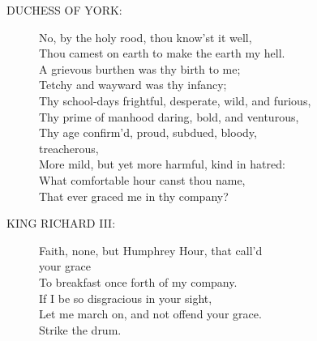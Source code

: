 \documentclass{article}
\begin{document}
\begin{description}
\item[DUCHESS OF YORK:] 
\hspace{1pt}No, by the holy rood, thou know'st it well,\\
\hspace{1pt}Thou camest on earth to make the earth my hell.\\
\hspace{1pt}A grievous burthen was thy birth to me;\\
\hspace{1pt}Tetchy and wayward was thy infancy;\\
\hspace{1pt}Thy school-days frightful, desperate, wild, and furious,\\
\hspace{1pt}Thy prime of manhood daring, bold, and venturous,\\
\hspace{1pt}Thy age confirm'd, proud, subdued, bloody,\\
\hspace{1pt}treacherous,\\
\hspace{1pt}More mild, but yet more harmful, kind in hatred:\\
\hspace{1pt}What comfortable hour canst thou name,\\
\hspace{1pt}That ever graced me in thy company?\\
\end{description}
\begin{description}
\item[KING RICHARD III:] 
\hspace{1pt}Faith, none, but Humphrey Hour, that call'd\\
\hspace{1pt}your grace\\
\hspace{1pt}To breakfast once forth of my company.\\
\hspace{1pt}If I be so disgracious in your sight,\\
\hspace{1pt}Let me march on, and not offend your grace.\\
\hspace{1pt}Strike the drum.\\
\end{description}
\end{document}
